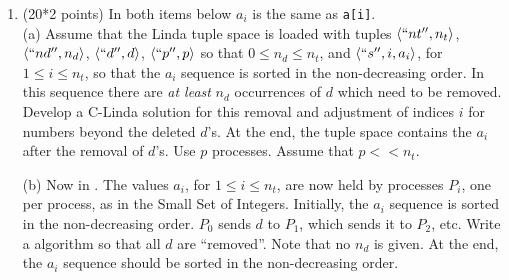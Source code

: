 \begin{enumerate}
\item (20*2 points)
In both items below $a_i$ is the same as {\tt a[i]}.\\

(a) Assume that the Linda tuple space is loaded with tuples $\langle
``nt'', n_t \rangle$, $\langle ``nd'', n_d \rangle$, $\langle ``d'', d \rangle$, $\langle
``p'', p \rangle$ so that $0 \le n_d \le n_t$, and $\langle ``s'', i, a_i
\rangle$, for $1 \le i \le n_t$, so that the $a_i$ sequence is sorted in
the non-decreasing order.  In this sequence there are {\em at least}
$n_d$ occurrences of $d$ which need to be removed.  Develop a C-Linda
solution for this removal and adjustment of indices $i$ for numbers
beyond the deleted $d$'s.  At the end, the tuple space contains the
$a_i$ after the removal of $d$'s.  Use $p$ processes.  Assume that $p
<< n_t$.

(b) Now in \CSP.  The values $a_i$, for $1 \le i \le n_t$, are now
held by processes $P_i$, one per process, as in the Small Set of
Integers.  Initially, the $a_i$ sequence is sorted in the
non-decreasing order.  $P_0$ sends $d$ to $P_1$, which sends it to
$P_2$, etc.  Write a \CSP algorithm so that all $d$ are ``removed''.
Note that no $n_d$ is given.  At the end,
the $a_i$ sequence should be sorted in the
non-decreasing order.
\end{enumerate}

